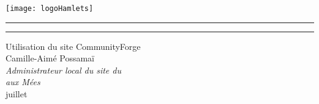 \thispagestyle{empty}
\pagecolor[rgb]{0.08,0.3,0.25}\afterpage{\pagecolor[rgb]{.95,.94,.86}}%
\vspace*{-3cm}
\texttt{[image: logoHamlets]}

\vspace{10mm}

\enlargethispage{3cm}
\begin{minipage}{20pt}
    \newcommand{\hcouv}{.95\textheight}
    \rule{.3pt}{0pt}\hspace{-.5pt}
    \rule{.2pt}{0pt}\hspace{-.5pt}
\end{minipage}
\begin{minipage}{.98\linewidth}  
    \vspace*{20mm}
    \begin{flushright}
     \textsf{\huge\color[rgb]{.98,.77,.05}\fontsize{28}{28}\selectfont Utilisation du site CommunityForge}\\[20mm]
     {\Large\color[rgb]{.98,.77,.05} Camille-Aimé {\sc Possamaï}}\\[2mm]
     \textsl{\color[rgb]{.98,.77,.05}Administrateur local du site du\\ \CdS aux Mées\\}
     \vspace{123mm}
     {\Large\color[rgb]{.98,.77,.05} juillet }
    \end{flushright}    
    \vfill\null
\end{minipage}


\newpage\ \thispagestyle{empty}\newpage
